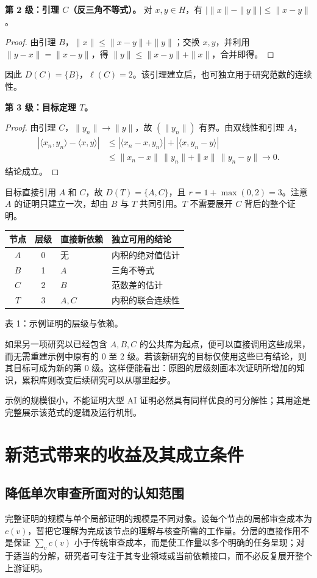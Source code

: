 \documentclass[UTF8,11pt,a4paper,fontset=fandol]{ctexart}
\theoremstyle{definition}\newtheorem{definition}{定义}
\begin{document}
\noindent\textbf{第 2 级：引理 $C$（反三角不等式）。} 对 $x,y\in H$，有 $|\|x\|-\|y\||\le\|x-y\|$。
\begin{proof}
由引理 $B$，$\|x\|\le\|x-y\|+\|y\|$；交换 $x,y$，并利用 $\|y-x\|=\|x-y\|$，得 $\|y\|\le\|x-y\|+\|x\|$，合并即得。
\end{proof}
因此 $D(C)=\{B\}$，$\ell(C)=2$。该引理建立后，也可独立用于研究范数的连续性。

\noindent\textbf{第 3 级：目标定理 $T$。}
\begin{proof}
由引理 $C$，$\|y_n\|\to\|y\|$，故 $(\|y_n\|)$ 有界。由双线性和引理 $A$，
\begin{align*}
 |\langle x_n,y_n\rangle-\langle x,y\rangle|
 &\le |\langle x_n-x,y_n\rangle|+|\langle x,y_n-y\rangle|\\
 &\le \|x_n-x\|\,\|y_n\|+\|x\|\,\|y_n-y\|\to0.
\end{align*}
结论成立。
\end{proof}
目标直接引用 $A$ 和 $C$，故 $D(T)=\{A,C\}$，且 $r=1+\max(0,2)=3$。注意 $A$ 的证明只建立一次，却由 $B$ 与 $T$ 共同引用。$T$ 不需要展开 $C$ 背后的整个证明。

\begin{center}\small
\begin{tabular}{ccll}\toprule
节点 & 层级 & 直接新依赖 & 独立可用的结论\\\midrule
$A$ & 0 & 无 & 内积的绝对值估计\\
$B$ & 1 & $A$ & 三角不等式\\
$C$ & 2 & $B$ & 范数差的估计\\
$T$ & 3 & $A,C$ & 内积的联合连续性\\\bottomrule
\end{tabular}\par\smallskip 表 1：示例证明的层级与依赖。
\end{center}

如果另一项研究以已经包含 $A,B,C$ 的公共库为起点，便可以直接调用这些成果，而无需重建示例中原有的 0 至 2 级。若该新研究的目标仅使用这些已有结论，则其目标可成为新的第 0 级。这样便能看出：原图的层级刻画本次证明所增加的知识，累积库则改变后续研究可以从哪里起步。

示例的规模很小，不能证明大型 AI 证明必然具有同样优良的可分解性；其用途是完整展示该范式的逻辑及运行机制。

\section{新范式带来的收益及其成立条件}
\subsection{降低单次审查所面对的认知范围}
完整证明的规模与单个局部证明的规模是不同对象。设每个节点的局部审查成本为 $c(v)$，暂把它理解为完成该节点的理解与核查所需的工作量。分层的直接作用不是保证 $\sum_v c(v)$ 小于传统审查成本，而是使工作量以多个明确的任务呈现；对于适当的分解，研究者可专注于其专业领域或当前依赖接口，而不必反复展开整个上游证明。
\end{document}
